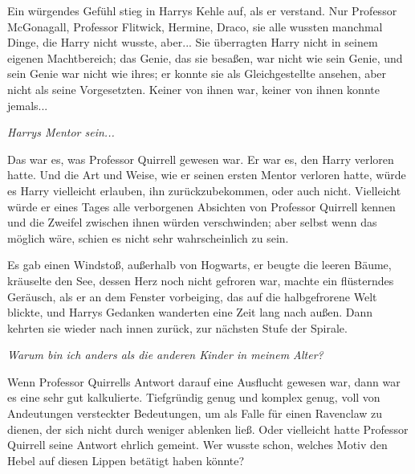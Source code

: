 Ein würgendes Gefühl stieg in Harrys Kehle auf, als er verstand. Nur Professor
McGonagall, Professor Flitwick, Hermine, Draco, sie alle wussten manchmal Dinge,
die Harry nicht wusste, aber... Sie überragten Harry nicht in seinem eigenen
Machtbereich; das Genie, das sie besaßen, war nicht wie sein Genie, und sein
Genie war nicht wie ihres; er konnte sie als Gleichgestellte ansehen, aber nicht
als seine Vorgesetzten. Keiner von ihnen war, keiner von ihnen konnte jemals...

\emph{Harrys Mentor sein... }

Das war es, was Professor Quirrell gewesen war. Er war es, den Harry verloren
hatte. Und die Art und Weise, wie er seinen ersten Mentor verloren hatte, würde
es Harry vielleicht erlauben, ihn zurückzubekommen, oder auch nicht. Vielleicht
würde er eines Tages alle verborgenen Absichten von Professor Quirrell kennen
und die Zweifel zwischen ihnen würden verschwinden; aber selbst wenn das möglich
wäre, schien es nicht sehr wahrscheinlich zu sein.

Es gab einen Windstoß, außerhalb von Hogwarts, er beugte die leeren Bäume,
kräuselte den See, dessen Herz noch nicht gefroren war, machte ein flüsterndes
Geräusch, als er an dem Fenster vorbeiging, das auf die halbgefrorene Welt
blickte, und Harrys Gedanken wanderten eine Zeit lang nach außen. Dann kehrten
sie wieder nach innen zurück, zur nächsten Stufe der Spirale.

\emph{Warum bin ich anders als die anderen Kinder in meinem Alter? }

Wenn Professor Quirrells Antwort darauf eine Ausflucht gewesen war, dann war es
eine sehr gut kalkulierte. Tiefgründig genug und komplex genug, voll von
Andeutungen versteckter Bedeutungen, um als Falle für einen Ravenclaw zu dienen,
der sich nicht durch weniger ablenken ließ. Oder vielleicht hatte Professor
Quirrell seine Antwort ehrlich gemeint. Wer wusste schon, welches Motiv den
Hebel auf diesen Lippen betätigt haben könnte?

